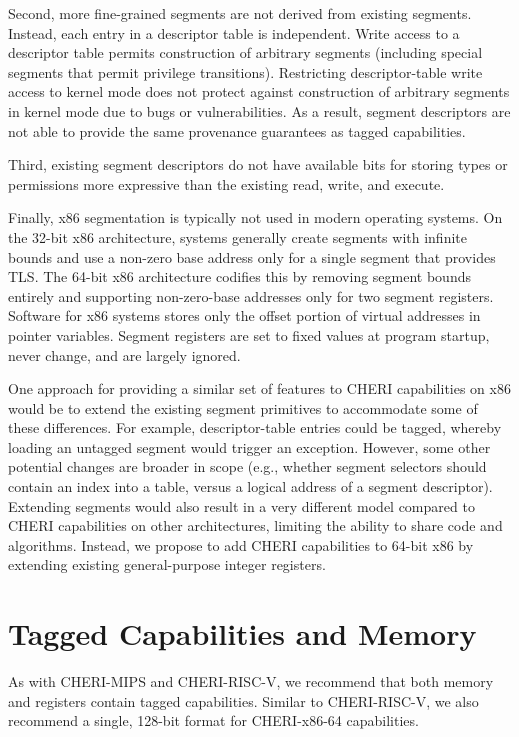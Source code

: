 Second, more fine-grained segments are not derived from existing
segments.  Instead, each entry in a descriptor table is independent.
Write access to a descriptor table permits construction of arbitrary
segments (including special segments that permit privilege
transitions).  Restricting descriptor-table write access to kernel
mode does not protect against construction of arbitrary segments in
kernel mode due to bugs or vulnerabilities.  As a result, segment
descriptors are not able to provide the same provenance guarantees as
tagged capabilities.

Third, existing segment descriptors do not have available bits for
storing types or permissions more expressive than the existing
read, write, and execute.

Finally, x86 segmentation is typically not used in modern operating
systems.  On the 32-bit x86 architecture, systems generally create
segments with infinite bounds and use a non-zero base address only
for a single segment that provides TLS.  The 64-bit x86 architecture
codifies this by removing segment bounds entirely and supporting non-zero-base
addresses only for two segment registers.
Software for x86 systems stores only the offset portion of virtual
addresses in pointer variables.  Segment registers are set to fixed
values at program startup, never change, and are largely ignored.

One approach for providing a similar set of features to CHERI
capabilities on x86 would be to extend the existing segment primitives
to accommodate some of these differences.  For example, descriptor-table
entries could be tagged, whereby loading an untagged segment would trigger
an exception.  However, some other potential changes are broader in
scope (e.g., whether segment selectors should contain an index into a
table, versus a logical address of a segment descriptor).  Extending
segments would also result in a very different model compared to CHERI
capabilities on other architectures, limiting the ability to share code
and algorithms.  Instead, we propose to add CHERI capabilities to 64-bit
x86 by extending existing general-purpose integer registers.

\section{Tagged Capabilities and Memory}

As with CHERI-MIPS and CHERI-RISC-V, we recommend that both memory and
registers contain tagged capabilities.  Similar to CHERI-RISC-V, we also
recommend a single, 128-bit format for CHERI-x86-64 capabilities.

